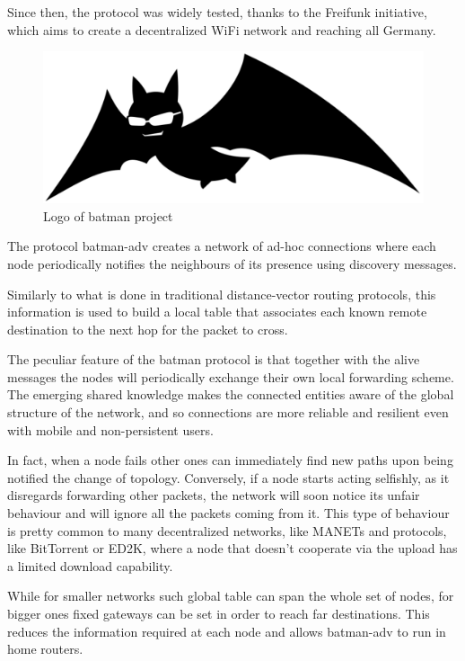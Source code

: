 \documentclass[conference,10.5pt]{IEEEtran}
\begin{document}
Since then, the protocol was widely tested, thanks to the Freifunk initiative, which aims to create a decentralized WiFi network and reaching all Germany.

\begin{figure}[h]
  \centering
  \includegraphics[width=0.8\linewidth]{figures/logo.pdf}
  \caption{Logo of \gls{batman} project}
  \label{fig:batman_logo}
\end{figure}

\smallskip


The protocol \gls{batman}-adv creates a network of ad-hoc connections where each node periodically notifies the neighbours of its presence using discovery messages.

Similarly to what is done in traditional distance-vector routing protocols, this information is used to build a local table that associates each known remote destination to the next hop for the packet to cross.

The peculiar feature of the \gls{batman} protocol is that together with the alive messages the nodes will periodically exchange their own local forwarding scheme. The emerging shared knowledge makes the connected entities aware of the global structure of the network, and so connections are more reliable and resilient even with mobile and non-persistent users.

In fact, when a node fails other ones can immediately find new paths upon being notified the change of topology.
Conversely, if a node starts acting selfishly, as it disregards forwarding other packets, the network will soon notice its unfair behaviour and will ignore all the packets coming from it.
This type of behaviour is pretty common to many decentralized networks, like MANETs \cite{MANETs} and protocols, like BitTorrent or ED2K, where a node that doesn't cooperate via the upload has a limited download capability.\cite{BitTorrent,ed2k}

While for smaller networks such global table can span the whole set of nodes, for bigger ones fixed gateways can be set in order to reach far destinations. This reduces the information required at each node and allows \gls{batman}-adv to run in home routers.
\end{document}
